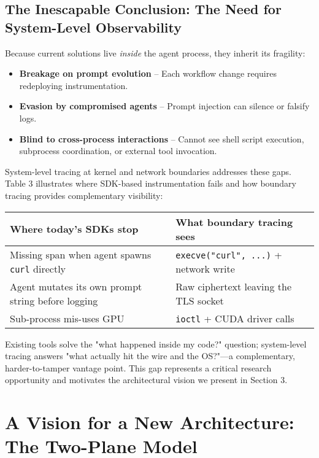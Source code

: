 \documentclass[sigplan,screen,review,9pt]{acmart}
\begin{document}
\subsection{The Inescapable Conclusion: The Need for System-Level Observability}

Because current solutions live \emph{inside} the agent process, they inherit its fragility:

\begin{itemize}
  \item \textbf{Breakage on prompt evolution} – Each workflow change requires redeploying instrumentation.
  \item \textbf{Evasion by compromised agents} – Prompt injection can silence or falsify logs.
  \item \textbf{Blind to cross-process interactions} – Cannot see shell script execution, subprocess coordination, or external tool invocation.
\end{itemize}

System-level tracing at kernel and network boundaries addresses these gaps. Table 3 illustrates where SDK-based instrumentation fails and how boundary tracing provides complementary visibility:

\begin{table}[h]
\centering
\small
\begin{tabular}{p{} p{}}
\toprule
\textbf{Where today's SDKs stop} & \textbf{What boundary tracing sees} \\
\midrule
Missing span when agent spawns \texttt{curl} directly & \texttt{execve("curl", ...)} + network write \\
Agent mutates its own prompt string before logging & Raw ciphertext leaving the TLS socket \\
Sub-process mis-uses GPU & \texttt{ioctl} + CUDA driver calls \\
\bottomrule
\end{tabular}
\end{table}

Existing tools solve the "what happened inside my code?" question; system-level tracing answers "what actually hit the wire and the OS?"—a complementary, harder-to-tamper vantage point. This gap represents a critical research opportunity and motivates the architectural vision we present in Section 3.

\section{A Vision for a New Architecture: The Two-Plane Model}
\end{document}
